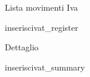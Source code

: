 \documentclass[a4paper]{article}
\newcommand{\SRE}{inserisci}
\begin{document}
\begin{centering}
\tabulinesep=1.5mm
\vspace{10 mm}
\begin{flushleft}
Lista movimenti Iva
\end{flushleft}
\SRE{vat_register}
\newpage
\begin{flushleft}
Dettaglio
\end{flushleft}
\SRE{vat_summary}
\end {centering}
\end{document}
